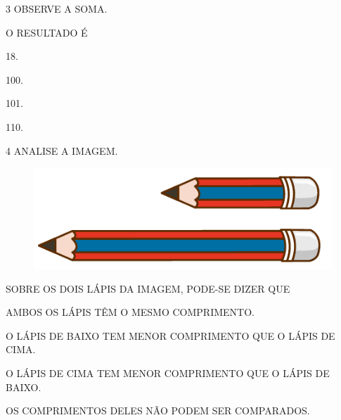 \num{3} OBSERVE A SOMA.\bigskip

\hspace*{\fill}\hspace*{\fill}

\vspace{1cm}

O RESULTADO É

\begin{escolha}%
\item 18.

\item 100.

\item 101.

\item 110.
\end{escolha}

\num{4} ANALISE A IMAGEM.


\begin{figure}[H]
\centering
\includegraphics[width=\textwidth]{./media/SAEB_1ANO_MAT_FIGURA113.png}
\end{figure}

SOBRE OS DOIS LÁPIS DA IMAGEM, PODE-SE DIZER QUE

\begin{escolha}%
\item AMBOS OS LÁPIS TÊM O MESMO COMPRIMENTO.

\item O LÁPIS DE BAIXO TEM MENOR COMPRIMENTO QUE O LÁPIS DE CIMA.

\item O LÁPIS DE CIMA TEM MENOR COMPRIMENTO QUE O LÁPIS DE BAIXO.

\item OS COMPRIMENTOS DELES NÃO PODEM SER COMPARADOS.
\end{escolha}

